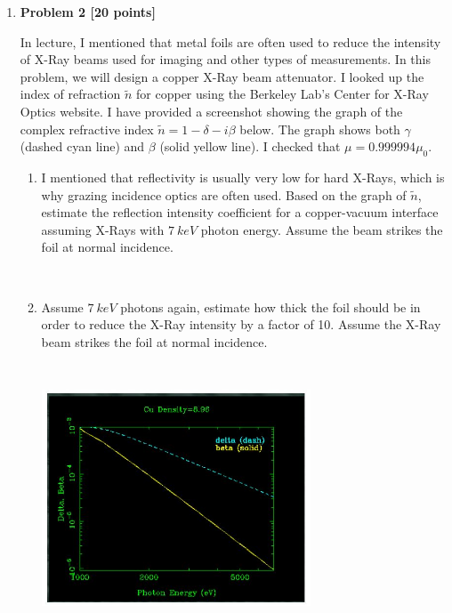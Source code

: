 \documentclass[fleqn]{article}
\begin{document}
\begin{enumerate}
\begin{enumerate}
    \end{enumerate}

  \pagebreak

  \item \textbf{Problem 2 [20 points]} 

  In lecture, I mentioned that metal foils are often used to reduce the intensity of X-Ray beams used for imaging 
  and other types of measurements. In this problem, we will design a copper X-Ray beam attenuator. I looked up the 
  index of refraction $\tilde{n}$ for copper using the Berkeley Lab's Center for X-Ray Optics website. I have 
  provided a screenshot showing the graph of the complex refractive index $\tilde{n}=1-\delta -i \beta$ below. The 
  graph shows both $\gamma$ (dashed cyan line) and $\beta$ (solid yellow line). I checked that $\mu=0.999994 \mu_0$.
    \begin{enumerate}
      \item I mentioned that reflectivity is usually very low for hard X-Rays, which is why grazing incidence
      optics are often used. Based on the graph of $\tilde{n}$, estimate the reflection intensity coefficient for a
      copper-vacuum interface assuming X-Rays with $7 ~ keV$ photon energy. Assume the beam strikes the foil at normal 
      incidence.

          \textcolor{hwColor}{
            \\
          }

      \item Assume $7 ~ keV$ photons again, estimate how thick the foil should be in order to reduce the
      X-Ray intensity by a factor of 10. Assume the X-Ray beam strikes the foil at normal incidence.

      \begin{center}
        \includegraphics[height=8cm, width=8cm]{1.JPG}
      \end{center}


\end{enumerate}
\end{enumerate}
\end{document}
